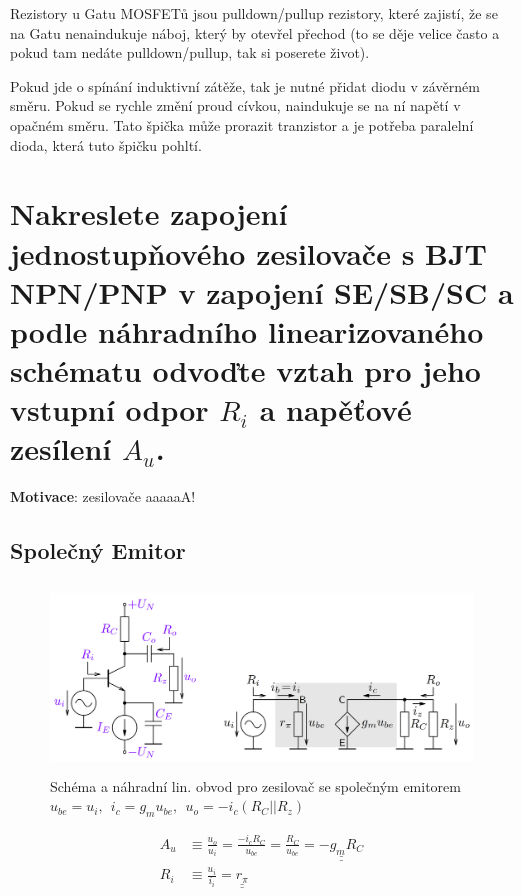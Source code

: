 \documentclass[a4paper,12pt]{article}   %
\begin{document}
Rezistory u Gatu MOSFETů jsou pulldown/pullup rezistory, které zajistí, že se na Gatu nenaindukuje náboj, který by otevřel přechod (to se děje velice často a pokud tam nedáte pulldown/pullup, tak si poserete život).

Pokud jde o spínání induktivní zátěže, tak je nutné přidat diodu v závěrném směru. Pokud se rychle změní proud cívkou, naindukuje se na ní napětí v opačném směru. Tato špička může prorazit tranzistor a je potřeba paralelní dioda, která tuto špičku pohltí.


\section{Nakreslete zapojení jednostupňového zesilovače s BJT NPN/PNP v zapojení SE/SB/SC a podle náhradního linearizovaného schématu odvoďte vztah pro jeho vstupní odpor $R_i$ a napěťové zesílení $A_u$.}
\textbf{Motivace}: zesilovače aaaaaA!

\subsection*{Společný Emitor}
\begin{figure}[h!]
    \centering
    \includegraphics[height=5cm]{NPN_SE.PNG}
    \caption{Schéma a náhradní lin. obvod pro zesilovač se společným emitorem\\\centering$u_{be} = u_i,~~i_c=g_mu_{be},~~u_o=-i_c(R_C||R_z)$}
    \label{fig:zes:se}
\end{figure}
\begin{align}
    A_u &\equiv \frac{u_o}{u_i} = \frac{-i_cR_C}{u_{be}} = \frac{R_C}{u_{be}} = \underline{\underline{-g_mR_C}}\\
    R_i &\equiv \frac{u_i}{i_i} = \underline{\underline{r_\pi}}
\end{align}
\end{document}
